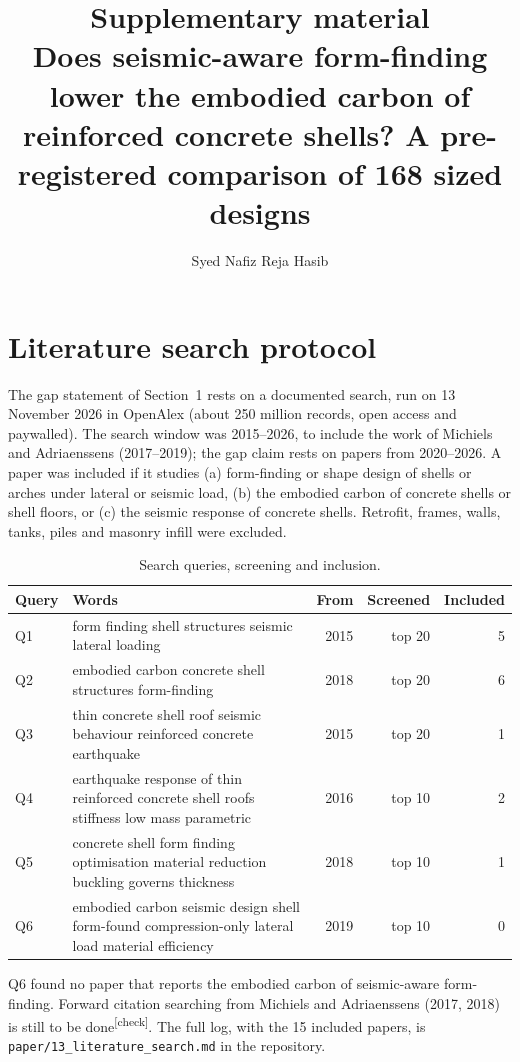 \documentclass[11pt,a4paper]{article}
\title{Supplementary material\\[1ex]\large Does seismic-aware form-finding lower the embodied carbon of reinforced concrete shells? A pre-registered comparison of 168 sized designs}
\author{Syed Nafiz Reja Hasib}
\date{}
\newcommand{\chk}{\textsuperscript{\textcolor{markcol}{\sffamily\scriptsize[check]}}}
\begin{document}
\maketitle

\section{Literature search protocol}

The gap statement of Section~1 rests on a documented search, run on 13 November 2026 in OpenAlex (about 250 million records, open access and paywalled). The search window was 2015--2026, to include the work of Michiels and Adriaenssens (2017--2019); the gap claim rests on papers from 2020--2026. A paper was included if it studies (a) form-finding or shape design of shells or arches under lateral or seismic load, (b) the embodied carbon of concrete shells or shell floors, or (c) the seismic response of concrete shells. Retrofit, frames, walls, tanks, piles and masonry infill were excluded.

\begin{table}[h]
\centering\small
\caption{Search queries, screening and inclusion.}
\begin{tabular}{llrrr}
\toprule
Query & Words & From & Screened & Included\\
\midrule
Q1 & form finding shell structures seismic lateral loading & 2015 & top 20 & 5\\
Q2 & embodied carbon concrete shell structures form-finding & 2018 & top 20 & 6\\
Q3 & thin concrete shell roof seismic behaviour reinforced concrete earthquake & 2015 & top 20 & 1\\
Q4 & earthquake response of thin reinforced concrete shell roofs stiffness low mass parametric & 2016 & top 10 & 2\\
Q5 & concrete shell form finding optimisation material reduction buckling governs thickness & 2018 & top 10 & 1\\
Q6 & embodied carbon seismic design shell form-found compression-only lateral load material efficiency & 2019 & top 10 & 0\\
\bottomrule
\end{tabular}
\end{table}

Q6 found no paper that reports the embodied carbon of seismic-aware form-finding. Forward citation searching from Michiels and Adriaenssens (2017, 2018) is still to be done\chk. The full log, with the 15 included papers, is \texttt{paper/13\_literature\_search.md} in the repository.
\end{document}
